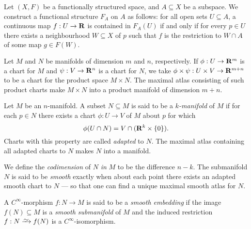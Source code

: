 \begin{definition}
\label{def:induced-func-struc-on-subspace}
Let \((X, F)\) be a functionally structured space, and \(A \subseteq X\) be a
subspace. We construct a functional structure \(F_A\) on \(A\) as follows: for
all open sets \(U \subseteq A\), a continuous map \(f: U \to \mathbf{R}\) is contained
in \(F_A(U)\) if and only if for every \(p \in U\) there exists a neighbourhood
\(W \subseteq X\) of \(p\) such that \(f\) is the restriction to \(W \cap A\) of
some map \(g \in F(W)\).
\end{definition}

\begin{definition}
\label{def:product-manifold}
Let \(M\) and \(N\) be manifolds of dimension \(m\) and \(n\), respectively. If
\(\phi: U \to \mathbf{R}^m\) is a chart for \(M\) and \(\psi: V \to \mathbf{R}^n\) is a chart
for \(N\), we take \(\phi \times \psi: U \times V \to \mathbf{R}^{m + n}\) to be a chart
for the product space \(M \times N\). The maximal atlas consisting of such
product charts make \(M \times N\) into a product manifold of dimension
\(m + n\).
\end{definition}

\begin{definition}[Submanifold]
\label{def:submanifold}
Let \(M\) be an \(n\)-manifold. A subset \(N \subseteq M\) is said to be a
\emph{\(k\)-manifold} of \(M\) if for each \(p \in N\) there exists a chart
\(\phi: U \to V\) of \(M\) about \(p\) for which
\[
\phi(U \cap N) = V \cap (\mathbf{R}^k \times \{0\}).
\]
Charts with this property are called \emph{adapted} to \(N\). The maximal atlas
containing all adapted charts to \(N\) makes \(N\) into a manifold.

We define the \emph{codimension} of \(N\) \emph{in} \(M\) to be the difference
\(n - k\). The submanifold \(N\) is said to be \emph{smooth} exactly when about
each point there exists an adapted smooth chart to \(N\) --- so that one can
find a unique maximal smooth atlas for \(N\).
\end{definition}

\begin{definition}
\label{def:smooth-embedding}
A \(C^{\infty}\)-morphism \(f: N \to M\) is said to be a \emph{smooth embedding}
if the image \(f(N) \subseteq M\) is a \emph{smooth submanifold} of \(M\) and
the induced restriction \(f: N \isoto f(N)\) is a \(C^{\infty}\)-isomorphism.
\end{definition}

